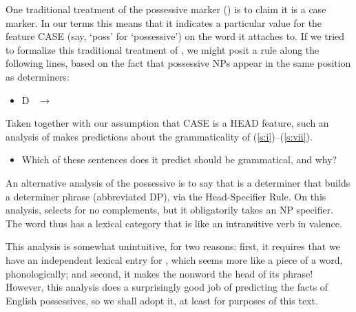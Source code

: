 \documentclass[a4paper,landscape,headrule,footrule]{foils}
\begin{document}
One
traditional treatment of the possessive marker ()
is to
claim it is a  case marker.
In our terms this means that it indicates 
a particular value for the feature CASE (say, `poss' for `possessive')
on the word it attaches to.
If we tried to formalize this traditional treatment of , we
might posit
a rule along the following lines, 
based on the fact that possessive NPs appear in the same position as determiners:
\begin{itemize}
\item[] D \ $\rightarrow$\ \ 
\end{itemize}
Taken together with our assumption that CASE is
a HEAD feature,  such an analysis of  
makes predictions about the grammaticality of (\ref{s:i})--(\ref{s:vii}).  
\begin{itemize}
\item[B.] Which of these sentences does it
predict should be grammatical, and why?

\end{itemize}


An  alternative analysis of the possessive is to say that %
is a
 determiner that builds a  determiner phrase (abbreviated DP),
via the Head-Specifier Rule. 
On this
analysis,   selects for no complements, but it obligatorily
takes an NP  specifier. The word  thus has a lexical category
that is like an intransitive verb in valence.

This analysis is somewhat unintuitive, for two reasons:  first, it
requires that we have an independent lexical entry for , which
seems more like a piece of a word, phonologically;  and second, it makes
the nonword  the head of its phrase!  However, this analysis
does a surprisingly good job of predicting the facts of English
 possessives, so we shall adopt it, at least for purposes of
this text.
\end{document}
